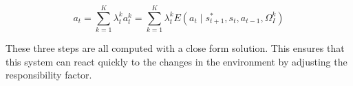 \begin{equation}
\label{e_mix}
a_t = \sum_{k=1}^K{\lambda_t^k a_t^k} = \sum_{k=1}^K{\lambda_t^k E\left({a_t \mid s^*_{t+1},s_t, a_{t-1}, \Omega^k_I}\right)}
\end{equation}

These three steps are all computed with a close form solution. This ensures that this system can react quickly to the changes in the environment by adjusting the responsibility factor.



